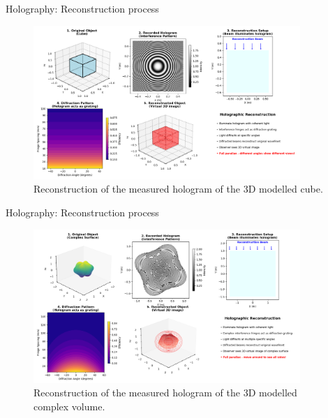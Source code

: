 \documentclass{beamer}
\begin{document}
\begin{frame}{Holography: Reconstruction process}
    \begin{figure}[h]
        \centering
        \includegraphics[width=0.9\textwidth]{Figures/cube-reconstruction.png}
        \caption{Reconstruction of the measured hologram of the 3D modelled cube.}
        \label{fig:cube_reconstruction}
    \end{figure}
\end{frame}
\begin{frame}{Holography: Reconstruction process}
    \begin{figure}[h]
        \centering
        \includegraphics[width=0.9\textwidth]{Figures/sphere-reconstruction.png}
        \caption{Reconstruction of the measured hologram of the 3D modelled complex volume.}
        \label{fig:sphere_reconstruction}
    \end{figure}
\end{frame}
\end{document}
